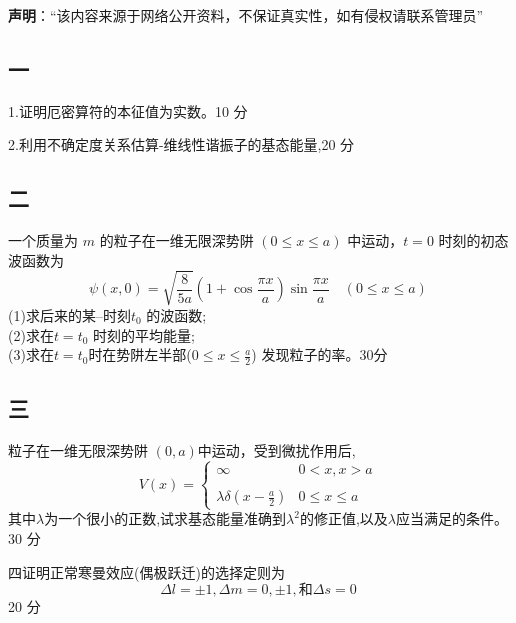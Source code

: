 
\textbf{声明}：“该内容来源于网络公开资料，不保证真实性，如有侵权请联系管理员”

\subsection{一}
1.证明厄密算符的本征值为实数。10 分

2.利用不确定度关系估算-维线性谐振子的基态能量,20 分

\subsection{二}
一个质量为 $m$ 的粒子在一维无限深势阱 $ (0 \leq x \leq a) $ 中运动，$t = 0$ 时刻的初态波函数为
$$\psi(x, 0) = \sqrt{\frac{8}{5a}} (1 + \cos \frac{\pi x}{a}) \sin \frac{\pi x}{a} \quad (0 \leq x \leq a)~$$ 
(1)求后来的某--时刻$t_0$ 的波函数;\\
(2)求在$t=t_0$ 时刻的平均能量;\\
(3)求在$t=t_0$时在势阱左半部($0\leq  x \leq \frac{a}{2}$) 发现粒子的率。30分

\subsection{三}
粒子在一维无限深势阱 $(0,a)$中运动，受到微扰作用后,
$$V(x) = \begin{cases} \infty & 0 < x, x > a \\\\ \lambda \delta \left( x - \frac{a}{2} \right) & 0 \leq x \leq a \end{cases}~$$
其中$\lambda$为一个很小的正数,试求基态能量准确到$\lambda^2$的修正值,以及$\lambda$应当满足的条件。30 分

四证明正常寒曼效应(偶极跃迁)的选择定则为
$$\Delta l = \pm 1, \Delta m = 0, \pm 1,\text{和} \Delta s = 0~$$
20 分